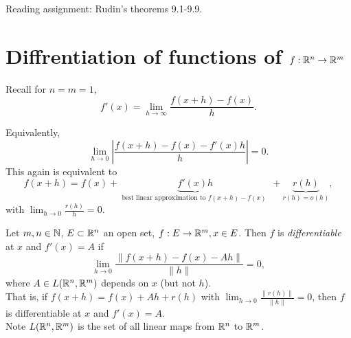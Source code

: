 \begin{thm}
\begin{remark}
\begin{enumerate}
		\end{enumerate}
		\item Reading assignment: Rudin's theorems 9.1-9.9.
	\end{remark}
\end{thm}

\section{Diffrentiation of functions of $f: \mathbb{R}^{n} \to \mathbb{R}^{m}$}

Recall for $n=m=1$,
\[
	f'(x)=\lim_{h\to \infty}{\frac{f(x+h)-f(x)}{h}}
	.\]

Equivalently, \[
	\lim_{h\to 0}{\left|\frac{f(x+h)-f(x)-f'(x)h}{h}\right|}=0
	.\]
This again is equivalent to
\[
	f(x+h)=f(x)+\underbrace{f'(x) h}_{\text{ best linear approximation to $f(x+h)-f(x)$ } }+\underbrace{r(h)}_{r(h)=o(h)}
	,\]
with $\lim_{h\to 0}{\frac{r(h)}{h}}=0$.


\begin{define}[11]
	Let $m,n \in \mathbb{N}$, $E \subset \mathbb{R}^{n}$ an open set, $f: E\to \mathbb{R}^{m}, x \in E$.
	Then $f$ is \textit{differentiable} at $x$ and $f'(x)=A$ if
	\[
		\lim_{h\to 0}{\frac{\|f(x+h)-f(x)-Ah\|}{\|h\|}}=0
		,\] where $A \in L(\mathbb{R}^{n},\mathbb{R}^{m})$ depends on $x$ (but not $h$).\\
	That is, if $f(x+h)=f(x)+Ah+r(h)$ with $\lim_{h\to 0}{\frac{\|r(h)\|}{\|h\|}}=0$, then $f$ is differentiable at $x$ and $f'(x)=A$.\\
	Note $L(\mathbb{R}^{n},\mathbb{R}^{m})$ is the set of all linear maps from $\mathbb{R}^{n}$ to $\mathbb{R}^{m}$.
\end{define}

